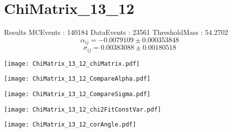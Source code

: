 \documentclass[a4paper,12pt]{article}
\begin{document}
\section{ChiMatrix\_13\_12}
\begin{minipage}{0.49\linewidth} Results \newline
MCEvents : 140184\newline
DataEvents : 23561 \newline
ThresholdMass : 54.2702\\
$$\alpha_{ij} = -0.0079109\pm 0.000353848$$
$$\sigma_{ij} = 0.00383088\pm 0.00180518$$
\end{minipage}\hfill
\begin{minipage}{0.49\linewidth} 
\texttt{[image: ChiMatrix\_13\_12\_chiMatrix.pdf]}\\
\end{minipage}
\hfill
\begin{minipage}{0.49\linewidth} 
\texttt{[image: ChiMatrix\_13\_12\_CompareAlpha.pdf]}\\
\end{minipage}
\hfill
\begin{minipage}{0.49\linewidth} 
\texttt{[image: ChiMatrix\_13\_12\_CompareSigma.pdf]}\\
\end{minipage}
\begin{minipage}{0.49\linewidth} 
\texttt{[image: ChiMatrix\_13\_12\_chi2FitConstVar.pdf]}\\
\end{minipage}
\hfill
\begin{minipage}{0.49\linewidth} 
\texttt{[image: ChiMatrix\_13\_12\_corAngle.pdf]}\\
\end{minipage}
\end{document}
